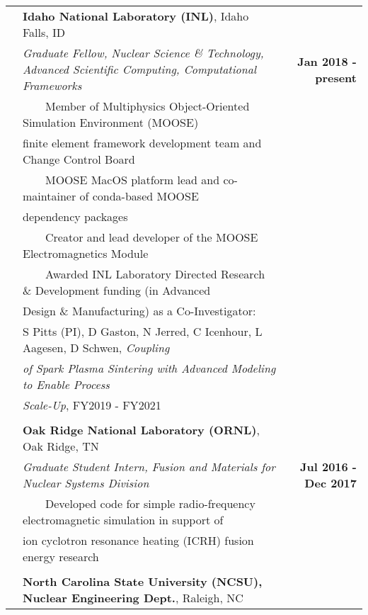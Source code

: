 \documentclass{article}
\newcommand{\tabitem}{~~\textbullet~~}
\begin{document}
\begin{tabularx}{\textwidth}{l X r}
	\hspace{2em} & \textbf{Idaho National Laboratory (INL)}, Idaho Falls, ID & \\
	& \textit{Graduate Fellow, Nuclear Science \& Technology, Advanced Scientific Computing, Computational Frameworks} & \textbf{Jan 2018 - present} \\
	& \tabitem Member of Multiphysics Object-Oriented Simulation Environment (MOOSE) & \\
	& \hspace{1.5em} finite element framework development team and Change Control Board & \\
  & \tabitem MOOSE MacOS platform lead and co-maintainer of conda-based MOOSE & \\
    & \hspace{1.5em} dependency packages & \\
	& \tabitem Creator and lead developer of the MOOSE Electromagnetics Module & \\
	& \tabitem Awarded INL Laboratory Directed Research \& Development funding (in Advanced & \\
	& \hspace{1.5em} Design \& Manufacturing) as a Co-Investigator: & \\
	& \hspace{2.5em} S Pitts (PI), D Gaston, N Jerred, C Icenhour, L Aagesen, D Schwen, \textit{Coupling} & \\
	& \hspace{2.5em} \textit{of Spark Plasma Sintering with Advanced Modeling to Enable Process} & \\
	& \hspace{2.5em} \textit{Scale-Up}, FY2019 - FY2021 & \\
	& & \\
	& \textbf{Oak Ridge National Laboratory (ORNL)}, Oak Ridge, TN & \\
	& \textit{Graduate Student Intern, Fusion and Materials for Nuclear Systems Division} & \textbf{Jul 2016 - Dec 2017} \\
	& \tabitem Developed code for simple radio-frequency electromagnetic simulation in support of & \\
	& \hspace{1.5em} ion cyclotron resonance heating (ICRH) fusion energy research & \\
	& & \\
	& \textbf{North Carolina State University (NCSU), Nuclear Engineering Dept.}, Raleigh, NC & \\

\end{tabularx}
\end{document}
